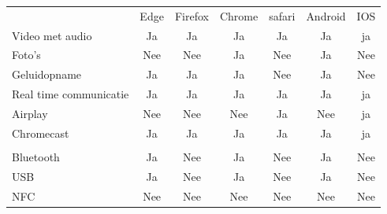 	\begin{table}[]
		\centering
		\begin{tabular}{p{6cm}cccccc}
			& Edge & Firefox & Chrome & safari& Android & IOS \\ 
			
			Video met audio & \cellcolor{green!40} Ja  & \cellcolor{green!40} Ja & \cellcolor{green!40} Ja  & \cellcolor{green!40} Ja & \cellcolor{green!40} Ja & \cellcolor{green!40} ja \\
			
			Foto's & \cellcolor{red!50} Nee  & \cellcolor{red!50} Nee & \cellcolor{green!40} Ja  & \cellcolor{red!50} Nee  & \cellcolor{green!40} Ja & \cellcolor{red!50} Nee \\
			
			Geluidopname & \cellcolor{green!40} Ja  & \cellcolor{green!40} Ja & \cellcolor{green!40} Ja & \cellcolor{red!50} Nee  & \cellcolor{green!40} Ja & \cellcolor{red!50} Nee \\
			
			Real time communicatie& \cellcolor{green!40} Ja  & \cellcolor{green!40} Ja & \cellcolor{green!40} Ja  & \cellcolor{green!40} Ja & \cellcolor{green!40} Ja & \cellcolor{green!40} ja \\
			
			Airplay & \cellcolor{red!50} Nee & \cellcolor{red!50} Nee & \cellcolor{red!50} Nee  & \cellcolor{green!40} Ja & \cellcolor{red!50} Nee & \cellcolor{green!40} ja \\
			
			Chromecast & \cellcolor{green!40} Ja  & \cellcolor{green!40} Ja & \cellcolor{green!40} Ja  & \cellcolor{green!40} Ja & \cellcolor{green!40} Ja & \cellcolor{green!40} ja \\
			
			 &  & &  &  &  &  \\
			 
			 Bluetooth & \cellcolor{green!40} Ja  &  \cellcolor{red!50} Nee & \cellcolor{green!40} Ja  & \cellcolor{red!50} Nee & \cellcolor{green!40} Ja &  \cellcolor{red!50} Nee \\
			 
			 USB & \cellcolor{green!40} Ja  &  \cellcolor{red!50} Nee & \cellcolor{green!40} Ja  & \cellcolor{red!50} Nee & \cellcolor{green!40} Ja &  \cellcolor{red!50} Nee \\
			 
			 NFC &  \cellcolor{red!50} Nee  &  \cellcolor{red!50} Nee &  \cellcolor{red!50} Nee  & \cellcolor{red!50} Nee &  \cellcolor{red!50} Nee &  \cellcolor{red!50} Nee \\
			 

\end{tabular}
\end{table}
